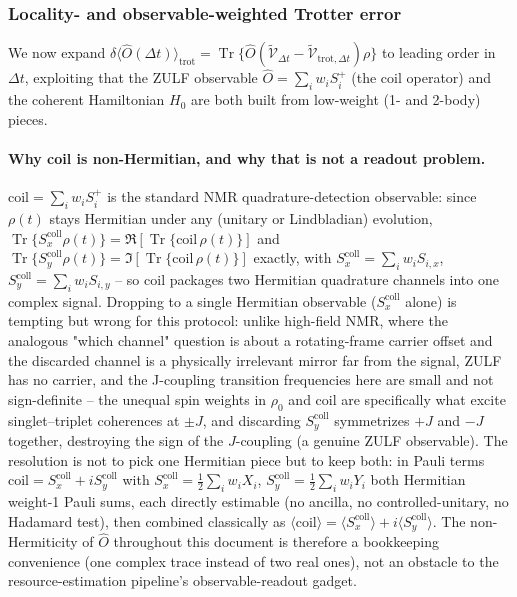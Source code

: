 \documentclass[11pt]{article}
\newcommand{\calV}{\mathcal{V}}
\newcommand{\Dt}{\Delta t}
\DeclareMathOperator{\Tr}{Tr}
\begin{document}
\subsubsection{Locality- and observable-weighted Trotter error}
\label{sec:trot_leading}

We now expand $\delta\langle\hat{O}(\Dt)\rangle_{\text{trot}}=\Tr\{\hat{O}\left(\tilde{\calV}_{\Dt}-\tilde{\calV}_{\text{trot},\Dt}\right)\rho\}$ to leading order in $\Dt$, exploiting that the ZULF observable $\hat{O}=\sum_iw_iS_i^+$ (the coil operator) and the coherent Hamiltonian $H_0$ are both built from low-weight (1- and 2-body) pieces.

\paragraph{Why coil is non-Hermitian, and why that is not a readout problem.} $\text{coil}=\sum_iw_iS_i^+$ is the standard NMR quadrature-detection observable: since $\rho(t)$ stays Hermitian under any (unitary or Lindbladian) evolution, $\Tr\{S_x^{\text{coll}}\rho(t)\}=\Re[\Tr\{\text{coil}\,\rho(t)\}]$ and $\Tr\{S_y^{\text{coll}}\rho(t)\}=\Im[\Tr\{\text{coil}\,\rho(t)\}]$ exactly, with $S_x^{\text{coll}}=\sum_iw_iS_{i,x}$, $S_y^{\text{coll}}=\sum_iw_iS_{i,y}$ -- so $\text{coil}$ packages two Hermitian quadrature channels into one complex signal. Dropping to a single Hermitian observable ($S_x^{\text{coll}}$ alone) is tempting but wrong for this protocol: unlike high-field NMR, where the analogous "which channel" question is about a rotating-frame carrier offset and the discarded channel is a physically irrelevant mirror far from the signal, ZULF has no carrier, and the J-coupling transition frequencies here are small and not sign-definite -- the unequal spin weights in $\rho_0$ and $\text{coil}$ are specifically what excite singlet--triplet coherences at $\pm J$, and discarding $S_y^{\text{coll}}$ symmetrizes $+J$ and $-J$ together, destroying the sign of the $J$-coupling (a genuine ZULF observable). The resolution is not to pick one Hermitian piece but to keep both: in Pauli terms $\text{coil}=S_x^{\text{coll}}+iS_y^{\text{coll}}$ with $S_x^{\text{coll}}=\tfrac12\sum_iw_iX_i$, $S_y^{\text{coll}}=\tfrac12\sum_iw_iY_i$ both Hermitian weight-1 Pauli sums, each directly estimable (no ancilla, no controlled-unitary, no Hadamard test), then combined classically as $\langle\text{coil}\rangle=\langle S_x^{\text{coll}}\rangle+i\langle S_y^{\text{coll}}\rangle$. The non-Hermiticity of $\hat{O}$ throughout this document is therefore a bookkeeping convenience (one complex trace instead of two real ones), not an obstacle to the resource-estimation pipeline's observable-readout gadget.
\end{document}

